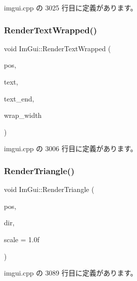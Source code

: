  imgui.\+cpp の 3025 行目に定義があります。

\mbox{\label{namespace_im_gui_aa483b40f6899e1b289b4bf6c2673d1d2}} 
\subsubsection{\texorpdfstring{Render\+Text\+Wrapped()}{RenderTextWrapped()}}
{\footnotesize\ttfamily void Im\+Gui\+::\+Render\+Text\+Wrapped (\begin{DoxyParamCaption}\item[{\mbox{\hyperlink{struct_im_vec2}{Im\+Vec2}}}]{pos,  }\item[{const char $\ast$}]{text,  }\item[{const char $\ast$}]{text\+\_\+end,  }\item[{float}]{wrap\+\_\+width }\end{DoxyParamCaption})}



 imgui.\+cpp の 3006 行目に定義があります。

\mbox{\label{namespace_im_gui_ad11a82904a65722d285230567af826b8}} 
\subsubsection{\texorpdfstring{Render\+Triangle()}{RenderTriangle()}}
{\footnotesize\ttfamily void Im\+Gui\+::\+Render\+Triangle (\begin{DoxyParamCaption}\item[{\mbox{\hyperlink{struct_im_vec2}{Im\+Vec2}}}]{pos,  }\item[{\mbox{\hyperlink{imgui__internal_8h_a4b8427c5153ae1d43278dc397d809335}{Im\+Gui\+Dir}}}]{dir,  }\item[{float}]{scale = {\ttfamily 1.0f} }\end{DoxyParamCaption})}



 imgui.\+cpp の 3089 行目に定義があります。

\mbox{\label{namespace_im_gui_aa03f31a184cafdf506feb2e8ba07f91e}} 
